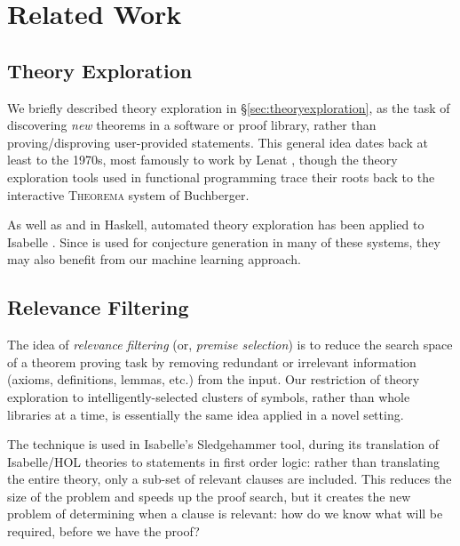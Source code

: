 \fi

\section{Related Work}
\label{sec:related}

\subsection{Theory Exploration}

We briefly described theory exploration in \S \ref{sec:theoryexploration}, as
the task of discovering \emph{new} theorems in a software or proof library,
rather than proving/disproving user-provided statements. This general idea dates
back at least to the 1970s, most famously to work by Lenat
\cite{lenat1977automated}, though the theory exploration tools used in
functional programming trace their roots back to the interactive
\textsc{Theorema} \cite{buchberger2000theory} system of Buchberger.

As well as \qspec{} and \hspec{} in Haskell, automated theory exploration has
been applied to Isabelle \cite{Montano-Rivas.McCasland.Dixon.ea:2012}
\cite{johansson2009isacosy} \cite{Hipster}. Since \qspec{} is used for
conjecture generation in many of these systems, they may also benefit from our
machine learning approach.

\subsection{Relevance Filtering}
\label{sec:relevance}

The idea of \emph{relevance filtering} (or, \emph{premise selection}) is to
reduce the search space of a theorem proving task by removing redundant or
irrelevant information (axioms, definitions, lemmas, etc.) from the input. Our
restriction of theory exploration to intelligently-selected clusters of symbols,
rather than whole libraries at a time, is essentially the same idea applied in a
novel setting.

The technique is used in Isabelle's Sledgehammer tool, during its translation of
Isabelle/HOL theories to statements in first order logic: rather than
translating the entire theory, only a sub-set of relevant clauses are
included. This reduces the size of the problem and speeds up the proof search,
but it creates the new problem of determining when a clause is relevant: how do
we know what will be required, before we have the proof?

